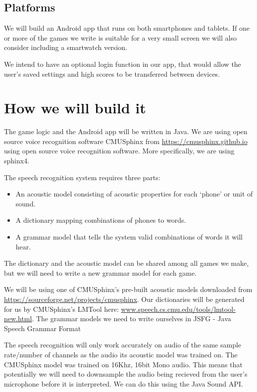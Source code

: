 \documentclass[11pt, oneside]{article}
\begin{document}
\subsection*{Platforms}

We will build an Android app that runs on both smartphones and
tablets. If one or more of the games we write is suitable for a very
small screen we will also consider including a smartwatch version.

We intend to have an optional login function in our app, that would
allow the user's saved settings and high scores to be transferred between
devices.


\section*{How we will build it}

The game logic and the Android app will be written in Java. We are
using open source voice recognition software CMUSphinx from
\url{https://cmusphinx.github.io} using open source voice recognition
software. More specifically, we are using sphinx4.

The speech recognition system requires three parts:
\begin{itemize}
\item An acoustic model consisting of acoustic properties for each
  `phone' or unit of sound.
\item A dictionary mapping combinations of phones to words.
\item A grammar model that tells the system valid combinations of
  words it will hear.
\end{itemize}

The dictionary and the acoustic model can be shared among all games we
make, but we will need to write a new grammar model for each game.

We will be using one of CMUSphinx's pre-built acoustic models
downloaded from \url{https://sourceforge.net/projects/cmusphinx}. Our
dictionaries will be generated for us by CMUSphinx's LMTool here:
\url{www.speech.cs.cmu.edu/tools/lmtool-new.html}. The grammar models
we need to write ourselves in JSFG - Java Speech Grammar Format

The speech recognition will only work accurately on audio of the same
sample rate/number of channels as the audio its acoustic model was
trained on. The CMUSphinx model was trained on 16Khz, 16bit Mono
audio. This means that potentially we will need to downsample the
audio being recieved from the user's microphone before it is
interpreted. We can do this using the Java Sound API.
\end{document}
